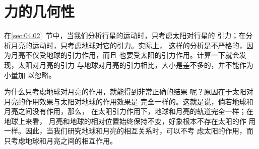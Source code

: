 \section{力的几何性}\label{sec:04.06}

在\ref{sec:04.02}~节中，当我们分析行星的运动时，只考虑太阳对行星的
引力；在分析月亮的运动时，只考虑地球对它的引力。实际上，
这样的分析是不严格的，因为月亮不仅受地球的引力作用，而且
也要受太阳的引力作用。计算一下就会发现，太阳对月亮的引力
与地球对月亮的引力相比，大小是差不多的，并不能作为小量加
以忽略。

为什么只考虑地球对月亮的作用，就能得到非常正确的结果
呢？原因在于太阳对月亮的作用效果与太阳对地球的作用效果是
完全一样的。这就是说，倘若地球和月亮之间没有作用，那么，
在太阳引力作用下，地球和月亮的轨道完全一样；在地球上来看，
月亮和地球的相对位置始终保持不变，好象根本不存在太阳的作
用一样。因此，当我们研究地球和月亮的相互关系时，可以不考
虑太阳的作用，而只考虑地球和月亮之间的相互作用。

